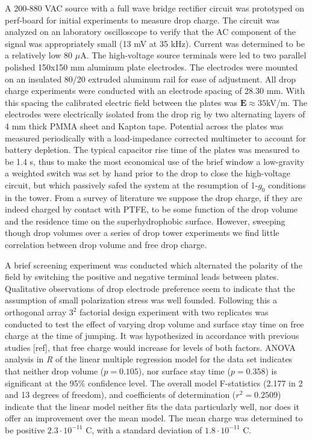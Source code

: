 \documentclass[12pt,a4paper,oneside]{book}
\begin{document}
A 200-880 VAC source with a full wave bridge rectifier circuit was prototyped on perf-board for initial experiments to measure drop charge. The circuit was analyzed on an laboratory oscilloscope to verify that the AC component of the signal was appropriately small (13 mV at 35 kHz). Current was determined to be a relatively low 80 $\mu$A. The high-voltage source terminals were led to two parallel polished 150x150 mm aluminum plate electrodes. The electrodes were mounted on an insulated 80/20 extruded aluminum rail for ease of adjustment. All drop charge experiments were conducted with an electrode spacing of 28.30 mm. With this spacing the calibrated electric field between the plates was $\mathbf{E} \approx 35$kV/m. The electrodes were electrically isolated from the drop rig by two alternating layers of 4 mm thick PMMA sheet and Kapton tape. Potential across the plates was measured periodically with a load-impedance corrected multimeter to account for battery depletion. The typical capacitor rise time of the plates was measured to be 1.4 s, thus to make the most economical use of the brief window a low-gravity a weighted switch was set by hand prior to the drop to close the high-voltage circuit, but which passively safed the system at the resumption of 1-$g_0$ conditions in the tower. From a survey of literature we suppose the drop charge, if they are indeed charged by contact with PTFE, to be some function of the drop volume and the residence time on the superhydrophobic surface. However, sweeping though drop volumes over a series of drop tower experiments we find little correlation between drop volume  and free drop charge.

A brief screening experiment was conducted which alternated the polarity of the field by switching the positive and negative terminal leads between plates. Qualitative observations of drop electrode preference seem to indicate that the assumption of small polarization stress was well founded. Following this a orthogonal array $3^2$ factorial design experiment with two replicates was conducted to test the effect of varying drop volume and surface stay time on free charge at the time of jumping. It was hypothesized in accordance with previous studies [ref], that free charge would increase for levels of both factors. ANOVA analysis in \emph{R} of the linear multiple regression model for the data set indicates that neither drop volume ($p=0.105$), nor surface stay time ($p=0.358$) is significant at the 95\% confidence level. The overall model F-statistics (2.177 in 2 and 13 degrees of freedom), and coefficients of determination ($r^2 = 0.2509$) indicate that the linear model neither fits the data particularly well, nor does it offer an improvement over the mean model. The mean charge was determined to be positive $2.3 \cdot 10^{-11}$ C, with a standard deviation of $1.8 \cdot 10^{-11}$ C.

\backmatter
\printbibliography
\end{document}
